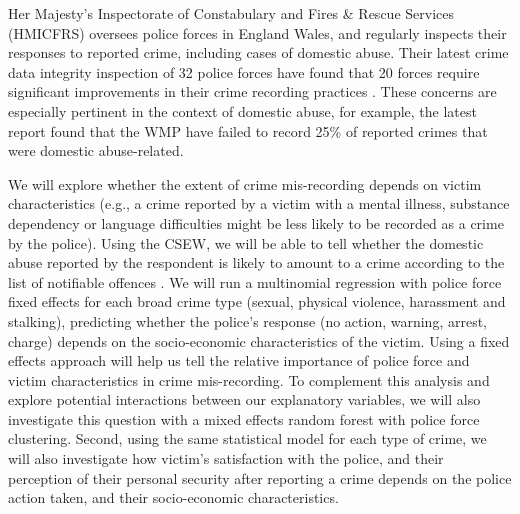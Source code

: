 \documentclass[11pt, a4paper]{article}
\begin{document}
 
 
 Her Majesty's Inspectorate of Constabulary and Fires \& Rescue Services (HMICFRS) oversees police forces in England Wales, and regularly inspects their responses to reported crime, including cases of domestic abuse. Their latest crime data integrity inspection of 32 police forces have found that 20 forces require significant improvements in their crime recording practices \cite{HerMajestysInspectorateofConstabularyandFires&RescueServices2019}. These concerns are especially pertinent in the context of domestic abuse, for example, the latest report found that the WMP have failed to record 25\% of reported crimes that were domestic abuse-related.
 
 

 We will explore whether the extent of crime mis-recording depends on victim characteristics (e.g., a crime reported by a victim with a mental illness, substance dependency or language difficulties might be less likely to be recorded as a crime by the police). Using the CSEW, we will be able to tell whether the domestic abuse reported by the respondent is likely to amount to a crime according to the list of notifiable offences \cite{countingrules}. We will run a multinomial regression with police force fixed effects for each broad crime type (sexual, physical violence, harassment and stalking), predicting whether the police's response (no action, warning, arrest, charge) depends on the socio-economic characteristics of the victim. Using a fixed effects approach will help us tell the relative importance of police force and victim characteristics in crime mis-recording. To complement this analysis and explore potential interactions between our explanatory variables, we will also investigate this question with a mixed effects random forest with police force clustering. Second, using the same statistical model for each type of crime, we will also investigate how victim's satisfaction with the police, and their perception of their personal security after reporting a crime depends on the police action taken, and their socio-economic characteristics.  
 
% 
% 
   
\end{document}

